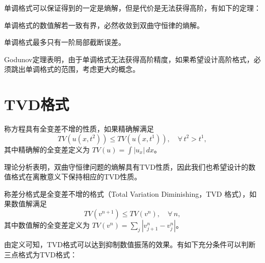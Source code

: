 单调格式可以保证得到的一定是熵解，但是代价是无法获得高阶，有如下的定理：

\begin{theorem}
    单调格式的数值解若一致有界，必然收敛到双曲守恒律的熵解。
\end{theorem}

\begin{theorem}[Godunov]
    单调格式最多只有一阶局部截断误差。
\end{theorem}

Godunov定理表明，由于单调格式无法获得高阶精度，如果希望设计高阶格式，必须跳出单调格式的范围，考虑更大的概念。

\section{TVD格式}

\begin{definition}
    称方程具有全变差不增的性质，如果精确解满足
    \[
        TV(u(x,t^2)) \le TV(u(x,t^1)), \quad \forall\, t^2 > t^1,
    \]
    其中精确解的全变差定义为 $TV(u) = \int |u_x|\,dx$。
\end{definition}

理论分析表明，双曲守恒律问题的熵解具有TVD性质，因此我们也希望设计的数值格式在离散意义下保持相应的TVD性质。
\begin{definition}[TVD格式]
    称差分格式是全变差不增的格式（Total Variation Diminishing，TVD 格式），如果数值解满足
    \[
        TV(v^{n+1}) \le TV(v^n),\quad \forall\, n,
    \]
    其中数值解的全变差定义为 $TV(v^n) = \sum_j |v^n_{j+1} - v^n_j|$。
\end{definition}

由定义可知，TVD格式可以达到抑制数值振荡的效果。有如下充分条件可以判断三点格式为TVD格式：

